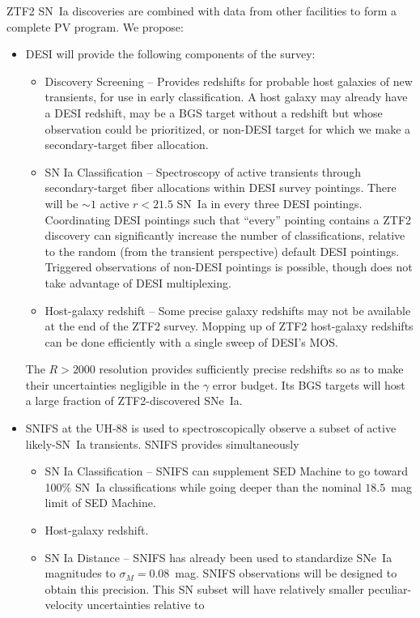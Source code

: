 \documentclass[11pt, oneside]{article}   	%
\begin{document}
ZTF2 SN~Ia discoveries are combined with data from other facilities to form a complete PV program.  We propose:
\begin{itemize}
\item DESI will provide the following components of the survey:
\begin{itemize}
\item Discovery Screening -- Provides redshifts for probable host galaxies of new transients, for use in early classification.  A host galaxy may
already have a DESI redshift, may be a BGS target without a redshift but whose observation could be prioritized,  or non-DESI target for which we
make a secondary-target fiber allocation.
\item SN Ia Classification -- Spectroscopy of active transients  through secondary-target fiber allocations within
DESI survey pointings. There
will be $\sim 1$ active $r<21.5$ SN~Ia in every three DESI pointings.  Coordinating DESI pointings such that ``every'' pointing contains
a  ZTF2 discovery can significantly increase the number of classifications, relative to the random (from the transient perspective) default DESI pointings.
Triggered observations of non-DESI pointings is possible, though does not take advantage of DESI multiplexing.
\item Host-galaxy redshift -- Some precise galaxy redshifts may not be available at the end of the ZTF2 survey.  Mopping up of ZTF2 host-galaxy redshifts
can be done efficiently with a single sweep of DESI's MOS.
\end{itemize}
 The $R>2000$ resolution
provides sufficiently precise redshifts so as to make their uncertainties negligible in the $\gamma$ error budget.
Its BGS targets  will host a large fraction of ZTF2-discovered SNe~Ia.
\item SNIFS at the UH-88 is used to spectroscopically observe a subset of active likely-SN~Ia transients.  SNIFS provides simultaneously
\begin{itemize}
\item SN Ia Classification -- SNIFS can supplement SED Machine to go toward 100\% SN~Ia classifications
while going deeper than the nominal $18.5$~mag limit of SED Machine.
\item Host-galaxy redshift.
\item SN Ia Distance -- SNIFS has already been used to standardize SNe~Ia magnitudes to $\sigma_M=0.08$~mag.  SNIFS observations will be
designed to obtain this precision.  This SN subset  will have relatively smaller peculiar-velocity uncertainties relative to 

\end{itemize}
\end{itemize}
\end{document}
